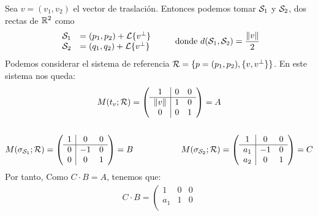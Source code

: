 \documentclass[12pt]{article}
\begin{document}
\begin{ejercicio}[4 puntos]
\begin{enumerate}
            Sea $v=(v_1,v_2)$ el vector de traslación. Entonces podemos tomar $\mathcal{S}_1$ y $\mathcal{S}_2$, dos rectas de $\mathbb{R}^2$ como
            \begin{gather*}
                \begin{array}{rl}
                    \mathcal{S}_1&=(p_1,p_2) + \mathcal{L}\{v^\perp\}\\
                    \mathcal{S}_2&=(q_1,q_2) + \mathcal{L}\{v^\perp\}\\
                \end{array}\qquad
                \text{ donde } d(\mathcal{S}_1,\mathcal{S}_2)=\frac{\|v\|}{2}
            \end{gather*}
            Podemos considerar el sistema de referencia $\mathcal{R}=\{p=(p_1,p_2),\{v, v^\perp \}\}$. 
            En este sistema nos queda:
            \begin{gather*}
                {M}(t_v;\mathcal{R})=\left(\begin{array}{c|cc}
                    1 & 0 & 0\\
                    \hline
                    \|v\| & 1 & 0\\
                    0 & 0 & 1
                \end{array}\right)=A\\
                \\
                M(\sigma_{\mathcal{S}_1}; \mathcal{R})=\left(\begin{array}{c|cc}
                    1 & 0 & 0\\
                    \hline
                    0 & -1 & 0\\
                    0 & 0 & 1
                \end{array}\right)=B \hspace{2cm}
                M(\sigma_{\mathcal{S}_2}; \mathcal{R})=\left(\begin{array}{c|cc}
                    1 & 0 & 0\\
                    \hline
                    a_1 & -1 & 0\\
                    a_2 & 0 & 1
                \end{array}\right)=C
            \end{gather*}
            Por tanto, Como $C\cdot B= A$, tenemos que:
            \begin{gather*}
                C\cdot B = \left(\begin{array}{c|cc}
                    1 & 0 & 0\\
                    \hline
                    a_1 & 1 & 0\\

\end{array}
\end{gather*}
\end{enumerate}
\end{ejercicio}
\end{document}
